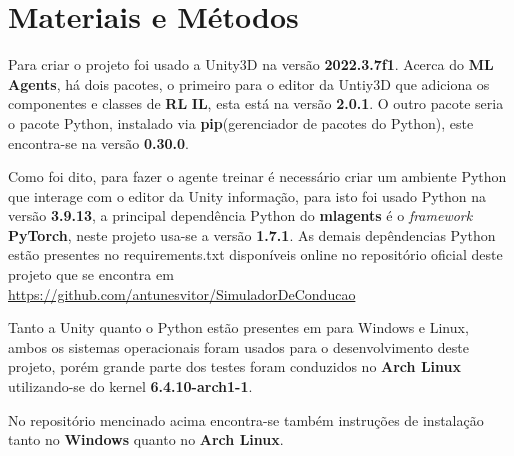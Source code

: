 \chapter{Materiais e Métodos}\label{cap:ferramentas}

Para criar o projeto foi usado a Unity3D na versão \textbf{2022.3.7f1}. Acerca do \textbf{ML Agents}, há dois pacotes, o primeiro para o editor da Untiy3D que adiciona os componentes e classes de \textbf{RL} \textbf{IL}, esta está na versão \textbf{2.0.1}. O outro pacote seria o pacote Python, instalado via \textbf{pip}(gerenciador de pacotes do Python), este encontra-se na versão \textbf{0.30.0}. 

Como foi dito, para fazer o agente treinar é necessário criar um ambiente Python que interage com o editor da Unity informação, para isto foi usado Python na versão \textbf{3.9.13}, a principal dependência Python do \textbf{mlagents} é o \textit{framework} \textbf{PyTorch}, neste projeto usa-se a versão \textbf{1.7.1}. As demais depêndencias Python estão presentes no requirements.txt disponíveis online no repositório oficial deste projeto que se encontra em \href{https://github.com/antunesvitor/SimuladorDeConducao}{https://github.com/antunesvitor/SimuladorDeConducao}

Tanto a Unity quanto o Python estão presentes em para Windows e Linux, ambos os sistemas operacionais foram usados para o desenvolvimento deste projeto, porém grande parte dos testes foram conduzidos no \textbf{Arch Linux} utilizando-se do kernel \textbf{6.4.10-arch1-1}.


No repositório mencinado acima encontra-se também instruções de instalação tanto no \textbf{Windows} quanto no \textbf{Arch Linux}.

